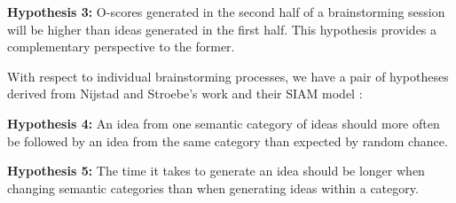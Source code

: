 \textbf{Hypothesis 3:} O-scores generated in the second half of a brainstorming session will be higher than ideas generated in the first half. This hypothesis provides a complementary perspective to the former.

With respect to individual brainstorming processes, we have a pair of hypotheses derived from Nijstad and Stroebe's work and their SIAM model \cite{nijstad_how_2006}:

\textbf{Hypothesis 4:} An idea from one semantic category of ideas should more often be followed by an idea from the same category than expected by random chance.

\textbf{Hypothesis 5:} The time it takes to generate an idea should be longer when changing semantic categories than when generating ideas within a category.


